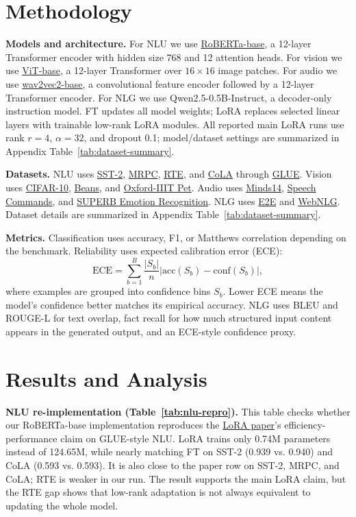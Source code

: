 \documentclass[11pt]{article}
\begin{document}
\section{Methodology}
\textbf{Models and architecture.} For NLU we use \hyperref[ref:roberta]{RoBERTa-base}, a 12-layer Transformer encoder with hidden size 768 and 12 attention heads. For vision we use \hyperref[ref:vit]{ViT-base}, a 12-layer Transformer over $16\times16$ image patches. For audio we use \hyperref[ref:wav2vec]{wav2vec2-base}, a convolutional feature encoder followed by a 12-layer Transformer encoder. For NLG we use Qwen2.5-0.5B-Instruct, a decoder-only instruction model. FT updates all model weights; LoRA replaces selected linear layers with trainable low-rank LoRA modules. All reported main LoRA runs use rank $r=4$, $\alpha=32$, and dropout 0.1; model/dataset settings are summarized in Appendix Table~\ref{tab:dataset-summary}.

\textbf{Datasets.} NLU uses \hyperref[ref:sst2]{SST-2}, \hyperref[ref:mrpc]{MRPC}, \hyperref[ref:rte]{RTE}, and \hyperref[ref:cola]{CoLA} through \hyperref[ref:glue]{GLUE}. Vision uses \hyperref[ref:cifar10]{CIFAR-10}, \hyperref[ref:beans]{Beans}, and \hyperref[ref:oxfordpet]{Oxford-IIIT Pet}. Audio uses \hyperref[ref:minds14]{Minds14}, \hyperref[ref:speechcommands]{Speech Commands}, and \hyperref[ref:superb]{SUPERB Emotion Recognition}. NLG uses \hyperref[ref:e2e]{E2E} and \hyperref[ref:webnlg]{WebNLG}. Dataset details are summarized in Appendix Table~\ref{tab:dataset-summary}.

\textbf{Metrics.} Classification uses accuracy, F1, or Matthews correlation depending on the benchmark. Reliability uses expected calibration error (ECE):
\[
    \mathrm{ECE}=\sum_{b=1}^{B}\frac{|S_b|}{n}\left|\mathrm{acc}(S_b)-\mathrm{conf}(S_b)\right|,
\]
where examples are grouped into confidence bins $S_b$. Lower ECE means the model's confidence better matches its empirical accuracy. NLG uses BLEU and ROUGE-L for text overlap, fact recall for how much structured input content appears in the generated output, and an ECE-style confidence proxy.

\section{Results and Analysis}
\textbf{NLU re-implementation (Table~\ref{tab:nlu-repro}).} This table checks whether our RoBERTa-base implementation reproduces the \hyperref[ref:lora]{LoRA paper}'s efficiency-performance claim on GLUE-style NLU. LoRA trains only 0.74M parameters instead of 124.65M, while nearly matching FT on SST-2 (0.939 vs. 0.940) and CoLA (0.593 vs. 0.593). It is also close to the paper row on SST-2, MRPC, and CoLA; RTE is weaker in our run. The result supports the main LoRA claim, but the RTE gap shows that low-rank adaptation is not always equivalent to updating the whole model.
\end{document}
